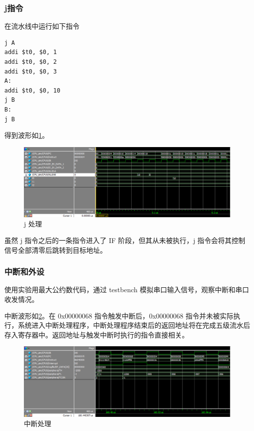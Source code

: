 \documentclass{ctexart}
\begin{document}
	\subsubsection{j指令}
	
	在流水线中运行如下指令

\begin{lstlisting}
j A
addi $t0, $0, 1
addi $t0, $0, 2
addi $t0, $0, 3
A:
addi $t0, $0, 10
j B
B:
j B
\end{lstlisting}

	得到波形如\ref{simpicture11}。

	\begin{figure}[ht]
		\centering
		\includegraphics[width = \textwidth]{PipelineTestWave4.eps}
		\caption{j 处理}
		\label{simpicture11}
	\end{figure}

	虽然 j 指令之后的一条指令进入了 IF 阶段，但其从未被执行，j 指令会将其控制信号全部清零后跳转到目标地址。

	\subsubsection{中断和外设}

	使用实验用最大公约数代码，通过 testbench 模拟串口输入信号，观察中断和串口收发情况。

	中断波形如\ref{simpicture12}。在 0x00000068 指令触发中断后，0x00000068 指令并未被实际执行，系统进入中断处理程序，中断处理程序结束后的返回地址将在完成五级流水后存入寄存器中。返回地址与触发中断时执行的指令直接相关。

	\begin{figure}[ht]
		\centering
		\includegraphics[width = \textwidth]{PipelineTestWave5.eps}
		\caption{中断处理}
		\label{simpicture12}
	\end{figure}
\end{document}
